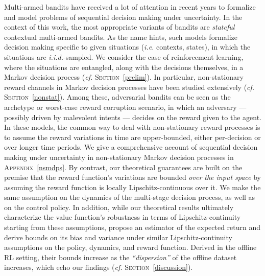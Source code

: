 Multi-armed bandits \cite{Robbins1952-sp}
have received a lot of attention in recent years
to formalize and model problems of sequential decision making under uncertainty.
In the context of this work, the most appropriate variants of bandits
are \emph{stateful} contextual multi-armed bandits.
As the name hints, such models formalize decision making specific to given situations
(\textit{i.e.} contexts, states), in which the situations are \textit{i.i.d.}-sampled.
We consider the case of reinforcement learning, where the situations are
entangled, along with the decisions themselves, in a Markov decision process
(\textit{cf.} \textsc{Section}~\ref{prelim}).
In particular, non-stationary reward channels in Markov decision processes
have been studied extensively
(\textit{cf.} \textsc{Section}~\ref{nonstat}).
Among these, adversarial bandits \cite{Auer1995-mm} can be seen as the archetype or worst-case
reward corruption scenario, in which an adversary
--- possibly driven by malevolent intents ---
decides on the reward given to the agent.
In these models, the common way to deal with non-stationary reward processes is to
assume the reward variations in time are upper-bounded, either per-decision or
over longer time periods.
We give a comprehensive account of sequential decision making under uncertainty
in non-stationary Markov decision processes
in \textsc{Appendix}~\ref{nsmdps}.
By contrast, our theoretical guarantees are built on the premise that
the reward function's variations are bounded \emph{over the input space} by
assuming the reward function is locally Lipschitz-continuous over it.
We make the same assumption on the dynamics of the multi-stage decision process,
as well as on the control policy.
In addition, while our theoretical results ultimately characterize the value function's robustness
in terms of Lipschitz-continuity starting from these assumptions,
\cite{Fonteneau2010-hu,Fonteneau2013-jw}
propose an estimator of the expected return and derive bounds on its bias and variance
under similar Lipschitz-continuity assumptions on the policy, dynamics, and reward function.
Derived in the offline RL setting,
their bounds increase as the \textit{``dispersion''} of the offline dataset increases,
which echo our findings (\textit{cf.} \textsc{Section}~\ref{discussion}).

